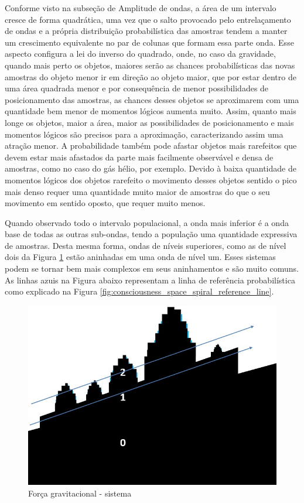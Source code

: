 Conforme visto na subseção de Amplitude de ondas, a área de um intervalo cresce de forma quadrática, uma vez que o salto provocado pelo entrelaçamento de ondas e a própria distribuição probabilística das amostras tendem a manter um crescimento equivalente no par de colunas que formam essa parte onda. Esse aspecto configura a lei do inverso do quadrado, onde, no caso da gravidade, quando mais perto os objetos, maiores serão as chances probabilísticas das novas amostras do objeto menor ir em direção ao objeto maior, que por estar dentro de uma área quadrada menor e por consequência de menor possibilidades de posicionamento das amostras, as chances desses objetos se aproximarem com uma quantidade bem menor de momentos lógicos aumenta muito. Assim, quanto mais longe os objetos, maior a área, maior as possibilidades de posicionamento e mais momentos lógicos são precisos para a aproximação, caracterizando assim uma atração menor. A probabilidade também pode afastar objetos mais rarefeitos que devem estar mais afastados da parte mais facilmente observável e densa de amostras, como no caso do gás hélio, por exemplo. Devido à baixa quantidade de momentos lógicos dos objetos rarefeito o movimento desses objetos sentido o pico mais denso requer uma quantidade muito maior de amostras do que o seu movimento em sentido oposto, que requer muito menos.

Quando observado todo o intervalo populacional, a onda mais inferior é a onda base de todas as outras sub-ondas, tendo a população uma quantidade expressiva de amostras. Desta mesma forma, ondas de níveis superiores, como as de nível dois da Figura \ref{fig:consciousness_gravitational_force_system} estão aninhadas em uma onda de nível um. Esses sistemas podem se tornar bem mais complexos em seus aninhamentos e são muito comuns. As linhas azuis na Figura abaixo representam a linha de referência probabilística como explicado na Figura \ref{fig:consciousness_space_spiral_reference_line}.
	\begin{figure}[H]
	\caption{Força gravitacional - sistema}
	\label{fig:consciousness_gravitational_force_system}
	\centering
	\includegraphics[scale=.6]{sections/images/consciousness_gravitational_force_system.jpg}
	\end{figure}


